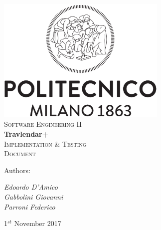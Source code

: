\documentclass [11pt,a4paper,oneside,openany]{book} %
\begin{document}

\begin{titlepage}

 \begin{center} 
     \includegraphics[height=6cm]{logo.eps}\\
     \vspace{4em}
     {\Large \textsc{Software Engineering II}}\\
     \vspace{6em}
     {\LARGE \textbf{Travlendar+}}\\
     \vspace{3em}
     {\Large \textsc{Implementation \& Testing}}\\
     \vspace{1em}
     {\Large \textsc{Document}}\\
 \end{center}
 
    \vskip 2cm
 
 	Authors:
 	\vspace{0.5em}
 	\begin{center}
      {\Large \textit{Edoardo D'Amico}}\\
      {\Large \textit{Gabbolini Giovanni}}\\
      {\Large \textit{Parroni Federico}}\\
    \end{center}

\vskip 2.0cm
\begin{center}
{\normalsize 1$^{st}$ November 2017}
\end{center}

\end{titlepage}

\newpage

\pagestyle{fancy}
\renewcommand{\chaptername}{Chapter}
\renewcommand{\chaptermark} [1]{\chaptername\ \thechapter.\ #1}{} 
\renewcommand{\chaptermark}[1]{\markboth{\thechapter.\ #1}{}} 
\renewcommand{\sectionmark}[1]{\markright{\thesection\ #1}}
\fancyhf{}
\fancyhead[LE,RO]{\bfseries\thepage} 
\fancyhead[LO,RE]{\bfseries\leftmark}
\end{document}
